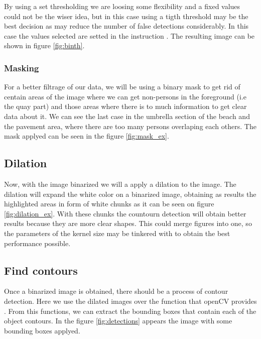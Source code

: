 \documentclass[11pt]{article}
\begin{document}


By using a set thresholding we are loosing some flexibility and a fixed values could not be the wiser idea, but in this case using a tigth threshold may be the best decision as may reduce the number of false detections considerably. In this case the values selected are setted in the instruction . The resulting image can be shown in figure \ref{fig:binth}.



\subsubsection*{Masking}
For a better filtrage of our data, we will be using a binary mask to get rid of centain areas of the image where we can get non-persons in the foreground (i.e the quay part) and those areas where there is to much information to get clear data about it. We can see the last case in the umbrella section of the beach and the pavement area, where there are too many persons overlaping each others. The mask applyed can be seen in the figure \ref{fig:mask_ex}.



\subsection{Dilation}
Now, with the image binarized we will a apply a dilation to the image. The dilation will expand the white color on a binarized image, obtaining as results the highlighted areas in form of white chunks as it can be seen on figure \ref{fig:dilation_ex}. With these chunks the countourn detection will obtain better results because they are more clear shapes. This could merge figures into one, so the parameters of the kernel size may be tinkered with to obtain the best performance possible.



\subsection{Find contours}
Once a binarized image is obtained, there should be a process of contour detection. Here we use the dilated images over the function that openCV provides . From this functions, we can extract the bounding boxes that contain each of the object contours. In the figure \ref{fig:detections} appears the image with some bounding boxes applyed.
\end{document}
